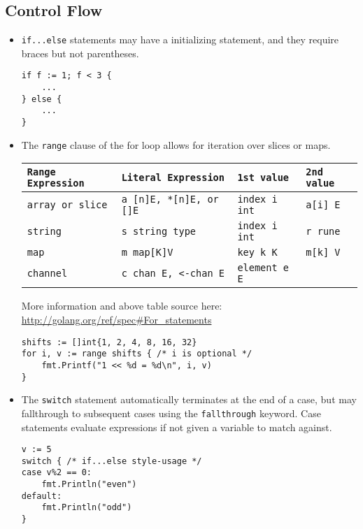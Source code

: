 \documentclass[12pt]{article}
\begin{document}
\subsection{Control Flow}
\begin{itemize}
    \item \texttt{if...else} statements may have a initializing
        statement, and they require braces but not parentheses.
      \begin{verbatim}
if f := 1; f < 3 {
    ...
} else {
    ...
}
          \end{verbatim}
    \item The \texttt{range} clause of the for loop allows for iteration
          over slices or maps.
          
          \begin{tabular}{| l | l | l | l |}
          \hline
          \texttt{Range Expression} &
          \texttt{Literal Expression} &
          \texttt{1st value} &
          \texttt{2nd value} \\
          \hline
          \texttt{array or slice} &
          \texttt{a  [n]E, *[n]E, or []E} &
          \texttt{index    i  int} &
          \texttt{a[i]       E} \\
          \hline
          \texttt{string} &
          \texttt{s  string type} &
          \texttt{index    i  int} &
          \texttt{r rune} \\
          \hline
          \texttt{map} &
          \texttt{m  map[K]V} &
          \texttt{key      k  K} &
          \texttt{m[k]       V} \\
          \hline
          \texttt{channel} &
          \texttt{c  chan E, <-chan E} &
          \texttt{element  e  E} & \\
          \hline
          \end{tabular}
          \bigskip

          More information and above table source here:
          \url{http://golang.org/ref/spec#For_statements}
        \begin{verbatim}
shifts := []int{1, 2, 4, 8, 16, 32}
for i, v := range shifts { /* i is optional */
    fmt.Printf("1 << %d = %d\n", i, v)
}
        \end{verbatim}
    \item The \texttt{switch} statement automatically terminates at the end
    of a case, but may fallthrough to subsequent cases using the
    \texttt{fallthrough} keyword. Case statements evaluate expressions if not
    given a variable to match against.
        \begin{verbatim}
v := 5
switch { /* if...else style-usage */
case v%2 == 0:
    fmt.Println("even")
default:
    fmt.Println("odd")
}


\end{verbatim}
\end{itemize}
\end{document}
